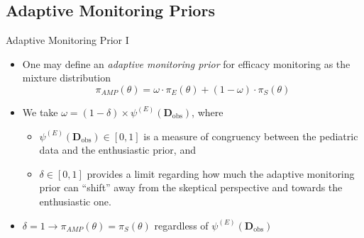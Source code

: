 \documentclass{beamer}
\begin{document}
\subsection{Adaptive Monitoring Priors}

\begin{frame}{Adaptive Monitoring Prior I}
\begin{itemize}
	\item 
	One may define an \textit{adaptive monitoring prior} for efficacy monitoring as the mixture distribution	
	\begin{equation*}
		\pi_{AMP}\left(\theta\right)=\omega\cdot\pi_E(\theta)+(1 - \omega)\cdot \pi_S(\theta)
	\end{equation*}
	
	\vspace{0.2cm}
	\item We take $\omega = (1 - \delta) \times \psi^{(E)}(\mathbf{D}_{\text{obs}})$, where 
	
	\begin{itemize}
	  \vspace{0.2cm}	
		\item $\psi^{(E)}(\mathbf{D}_{\text{obs}}) \in [0,1]$ is a measure
		      of congruency between the pediatric data and the enthusiastic prior, and
					
		\vspace{0.2cm}		
		\item $\delta \in [0,1]$ provides a limit regarding how much the adaptive monitoring prior can ``shift'' away from
					the skeptical perspective and towards the enthusiastic one.			
	\end{itemize}
	
		\vspace{0.2cm}								
		\item $\delta=1 \rightarrow \pi_{AMP}\left(\theta\right) = \pi_{S}\left(\theta\right)$ regardless of $\psi^{(E)}(\mathbf{D}_{\text{obs}})$	
					
\end{itemize}
\end{frame}
\end{document}
